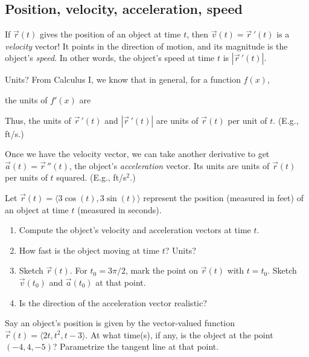 \vspace{.5in}

\subsection{Position, velocity, acceleration, speed}
If $\vec{r}(t)$ gives the position of an object at time $t$, then $\vec{v}(t)=\vec{r}\,'(t)$ is a \emph{velocity} vector! It points in the direction of motion, and its magnitude is the object's \emph{speed}. In other words, the object's speed at time $t$ is $|\vec{r}\,'(t)|$.

Units? From Calculus I, we know that in general, for a function $f(x)$,
\begin{center}the units of $f'(x)$ are \hspace{3in}\mbox{}\end{center}
\bigskip

Thus, the units of $\vec{r}\,'(t)$ and $|\vec{r}\,'(t)|$ are units of $\vec{r}(t)$ per unit of $t$. (E.g., ft/s.)

Once we have the velocity vector, we can take another derivative to get $\vec{a}(t)=\vec{r}\,''(t)$, the object's \emph{acceleration} vector. Its units are units of $\vec{r}(t)$ per units of $t$ squared. (E.g., ft/s$^2$.)


\begin{ex}
    Let $\vec{r}(t)=\langle 3\cos(t),3\sin(t)\rangle$ represent the position (measured in feet) of an object at time $t$ (measured in seconds).
    \begin{enumerate}
        \item Compute the object's velocity and acceleration vectors at time $t$.
        \item How fast is the object moving at time $t$? Units?
        \item Sketch $\vec{r}(t)$. For $t_0=3\pi/2$, mark the point on $\vec{r}(t)$ with $t=t_0$. Sketch $\vec{v}(t_0)$ and $\vec{a}(t_0)$ at that point.
        \item Is the direction of the acceleration vector realistic?
        \end{enumerate}
\end{ex}
\vfill

\begin{ex}
    Say an object's position is given by the vector-valued function $\vec{r}(t)=\langle 2t,t^2,t-3\rangle$. At what time(s), if any, is the object at the point $(-4,4,-5)$? Parametrize the tangent line at that point.
\end{ex}
\vspace{1in}

